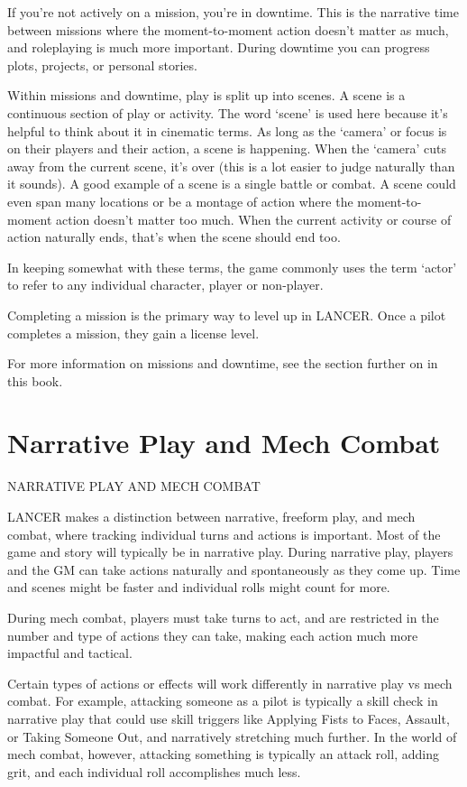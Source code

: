 If you’re not actively on a mission, you’re in downtime. This is the narrative time between 
missions where the moment-to-moment action doesn’t matter as much, and roleplaying is much 
more important. During downtime you can progress plots, projects, or personal stories. 

Within missions and downtime, play is split up into scenes. A scene is a continuous section of 
play or activity. The word ‘scene’ is used here because it’s helpful to think about it in cinematic 
terms. As long as the ‘camera’ or focus is on their players and their action, a scene is happening. 
When the ‘camera’ cuts away from the current scene, it’s over (this is a lot easier to judge 
naturally than it sounds). A good example of a scene is a single battle or combat. A scene could 
even span many locations or be a montage of action where the moment-to-moment action 
doesn’t matter too much. When the current activity or course of action naturally ends, that’s 
when the scene should end too. 

In keeping somewhat with these terms, the game commonly uses the term ‘actor’ to refer to any 
individual character, player or non-player. 

                                                                                                                 


Completing a mission is the primary way to level up in LANCER. Once a pilot completes a  
mission, they gain a license level.
 

For more information on missions and downtime, see the section further on in this book.
 
 
\chapter{Narrative Play and Mech Combat}
                          NARRATIVE PLAY AND MECH COMBAT  

LANCER makes a distinction between narrative, freeform play, and mech combat, where tracking  
individual turns and actions is important. Most of the game and story will typically be in narrative  
play. During narrative play, players and the GM can take actions naturally and spontaneously as  
they come up. Time and scenes might be faster and individual rolls might count for more.
 
	        During mech combat, players must take turns to act, and are restricted in the number  
and type of actions they can take, making each action much more impactful and tactical.
 
	        Certain types of actions or effects will work differently in narrative play vs mech combat.  
For example, attacking someone as a pilot is typically a skill check in narrative play that could  
use skill triggers like Applying Fists to Faces, Assault, or Taking Someone Out, and narratively  
stretching much further. In the world of mech combat, however, attacking something is typically  
an attack roll, adding grit, and each individual roll accomplishes much less.
 

                                                                           